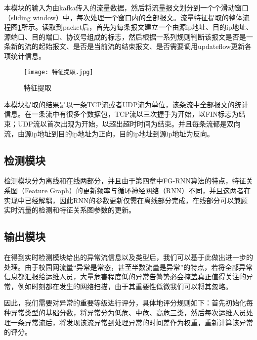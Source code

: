 本模块的输入为由kafka传入的流量数据，然后将流量报文划分到一个个滑动窗口（sliding window）中，每次处理一个窗口内的全部报文。流量特征提取的整体流程图\ref{fig:特征提取}所示。读取到packet后，首先为每条报文建立一个由源ip地址、目的ip地址、源端口、目的端口、协议号组成的标志，然后根据一系列规则判断该报文是否是一条新的流的起始报文、是否是当前流的结束报文、是否需要调用updateflow更新各项统计信息。

\begin{figure}
  \centering
  \texttt{[image: 特征提取.jpg]}
  \caption{特征提取}
  \label{fig:特征提取}
\end{figure}

本模块提取的结果是以一条TCP流或者UDP流为单位，该条流中全部报文的统计信息。在一条流中有很多个数据包，TCP流以三次握手为开始，以FIN标志为结束；UDP流以首次出现为开始，以超出超时时间为结束。并且每条流都是双向流，由源ip地址到目的ip地址为正向，目的ip地址到源ip地址为反向。

\subsection{检测模块}
检测模块分为离线和在线两部分，并且由于第四章中FG-RNN算法的特点，特征关系图（Feature Graph）的更新频率与循环神经网络（RNN）不同，并且这两者在实现中已经解耦，因此RNN的参数更新仅需在离线部分完成，在线部分可以兼顾实时流量的检测和特征关系图参数的更新。

\subsection{输出模块}
在得到实时检测模块给出的异常流信息以及类型后，我们可以基于此做出进一步的处理。由于校园网流量“异常是常态，甚至半数流量是异常”的特点，若将全部异常信息都汇报给运维人员，大量危害程度低的异常告警势必会掩盖真正值得关注的异常，例如时刻都在发生的网络扫描，由于其重要性低微我们可以将其忽略。

因此，我们需要对异常的重要等级进行评分，具体地评分规则如下：首先初始化每种异常类型的基础分数，将异常分为低危、中危、高危三类，然后每次运维人员处理一条异常流后，将发现该流异常到处理异常的时间差作为权重，重新计算该异常的评分。



